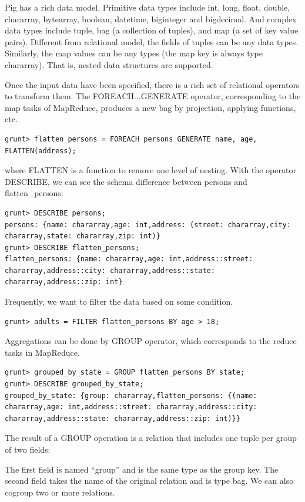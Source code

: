 \documentclass[11pt]{book}
\begin{document}
Pig has a rich data model. Primitive data types include int, long, float, double, chararray, bytearray, boolean, datetime, biginteger and bigdecimal. And complex data types include tuple, bag (a collection of tuples), and map (a set of key value pairs). Different from relational model, the fields of tuples can be any data types. Similarly, the map values can be any types (the map key is always type chararray). That is, nested data structures are supported.

Once the input data have been specified, there is a rich set of relational operators to transform them. The FOREACH...GENERATE operator, corresponding to the map tasks of MapReduce, produces a new bag by projection, applying functions, etc.

\begin{lstlisting}
grunt> flatten_persons = FOREACH persons GENERATE name, age, FLATTEN(address);
\end{lstlisting}
where FLATTEN is a function to remove one level of nesting. With the operator DESCRIBE, we can see the schema difference between persons and flatten\_persons:

\begin{lstlisting}
grunt> DESCRIBE persons;
persons: {name: chararray,age: int,address: (street: chararray,city: chararray,state: chararray,zip: int)}
grunt> DESCRIBE flatten_persons;
flatten_persons: {name: chararray,age: int,address::street: chararray,address::city: chararray,address::state: chararray,address::zip: int}
\end{lstlisting}
Frequently, we want to filter the data based on some condition.

\begin{lstlisting}
grunt> adults = FILTER flatten_persons BY age > 18;
\end{lstlisting}
Aggregations can be done by GROUP operator, which corresponds to the reduce tasks in MapReduce.

\begin{lstlisting}
grunt> grouped_by_state = GROUP flatten_persons BY state;
grunt> DESCRIBE grouped_by_state;
grouped_by_state: {group: chararray,flatten_persons: {(name: chararray,age: int,address::street: chararray,address::city: chararray,address::state: chararray,address::zip: int)}}
\end{lstlisting}
The result of a GROUP operation is a relation that includes one tuple per group of two fields:

The first field is named ``group'' and is the same type as the group key.
The second field takes the name of the original relation and is type bag.
We can also cogroup two or more relations.
\end{document}
